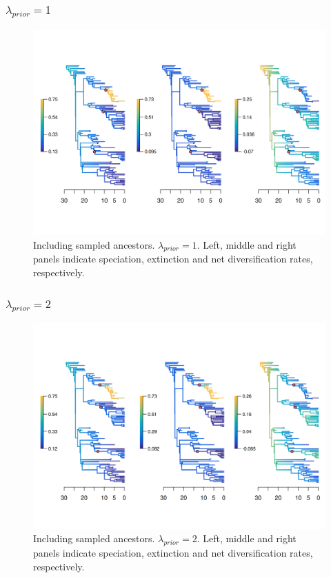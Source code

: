 \documentclass[a4paper, 12pt]{article}
\begin{document}
\subsubsection{$\lambda_{prior} = 1$}

\begin{figure}[H]
  \centering
  \includegraphics[width = \linewidth]{figures/diversification/main-analysis-with-sampled-ancestors/main-analysis-with-sampled-ancestors.png}
  \caption{Including sampled ancestors. $\lambda_{prior} = 1$. Left, middle and right panels indicate speciation, extinction and net diversification rates, respectively.}
  \label{fig-full-1}
\end{figure}

\subsubsection{$\lambda_{prior} = 2$}

\begin{figure}[H]
  \centering
  \includegraphics[width = \linewidth]{figures/diversification/sensitivity-analyses-with-sampled-ancestors/shifts-2/sensitivity-analysis-with-sampled-ancestors-2.png}
  \caption{Including sampled ancestors. $\lambda_{prior} = 2$. Left, middle and right panels indicate speciation, extinction and net diversification rates, respectively.}
  \label{fig-full-2}
\end{figure}
\end{document}
